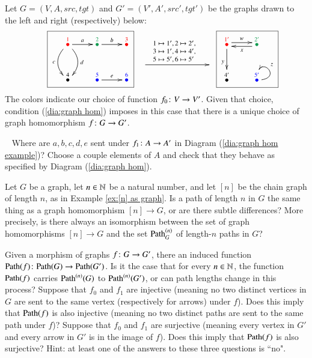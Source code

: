 \begin{example}\label{ex:graph hom}

Let $G=(V,A,src,tgt)$ and $G'=(V',A',src',tgt')$ be the graphs drawn to the left and right (respectively) below:
\begin{align}\label{dia:graph hom example}
\parbox{1.5in}{\fbox{\xymatrix{\LMO{\color{red}{1}}\ar[r]^a\ar@/^1pc/[d]^d\ar@/_1pc/[d]_c&\LMO{\color{ForestGreen}{2}}\ar[r]^b&\LMO{\color{red}{3}}\\\LMO{4}&\LMO{\color{blue}{5}}\ar[r]^e&\LMO{\color{blue}{6}}}}}
\parbox{1in}{\xymatrix{~\ar[rr]^{\parbox{.8in}{\vspace{-.2in}\footnotesize$1\mapsto 1', 2\mapsto 2',\\ 3\mapsto 1',4\mapsto 4',\\ 5\mapsto 5',6\mapsto5'$}}&\hsp&~}}
\parbox{.8in}{\fbox{\xymatrix{\LMO{\color{red}{1'}}\ar@<.5ex>[r]^w\ar[d]_y&\LMO{\color{ForestGreen}{2'}}\ar@<.5ex>[l]^x\\\LMO{4'}&\LMO{\color{blue}{5'}}\ar@(r,u)[]_z}}}
\end{align}
The colors indicate our choice of function $f_0\colon V\rightarrow V'$. Given that choice, condition (\ref{dia:graph hom}) imposes in this case that there is a unique choice of graph homomorphism $f\colon G\rightarrow G'$. 

\end{example}

\begin{exercise}~
\sexc Where are $a,b,c,d,e$ sent under $f_1\colon A\rightarrow A'$ in Diagram (\ref{dia:graph hom example})? 
\next Choose a couple elements of $A$ and check that they behave as specified by Diagram (\ref{dia:graph hom}).
\endsexc
\end{exercise}

\begin{exercise}
Let $G$ be a graph, let $n\in{\mathbb N}$ be a natural number, and let $[n]$ be the chain graph of length $n$, as in Example \ref{ex:[n] as graph}. Is a path of length $n$ in $G$ the same thing as a graph homomorphism $[n]\to G$, or are there subtle differences? More precisely, is there always an isomorphism between the set of graph homomorphisms $[n]\to G$ and the set $\Path_G^{(n)}$ of length-$n$ paths in $G$?
\end{exercise}

\begin{exercise}
Given a morphism of graphs $f\colon G\rightarrow G'$, there an induced function $\Path(f)\taking\Path(G)\to\Path(G')$. 
\sexc Is it the case that for every $n\in{\mathbb N}$, the function $\Path(f)$ carries $\Path^{(n)}(G)$ to $\Path^{(n)}(G')$, or can path lengths change in this process?
\next Suppose that $f_0$ and $f_1$ are injective (meaning no two distinct vertices in $G$ are sent to the same vertex (respectively for arrows) under $f$). Does this imply that $\Path(f)$ is also injective (meaning no two distinct paths are sent to the same path under $f$)?
\next Suppose that $f_0$ and $f_1$ are surjective (meaning every vertex in $G'$ and every arrow in $G'$ is in the image of $f$). Does this imply that $\Path(f)$ is also surjective? Hint: at least one of the answers to these three questions is ``no".
\endsexc
\end{exercise}

